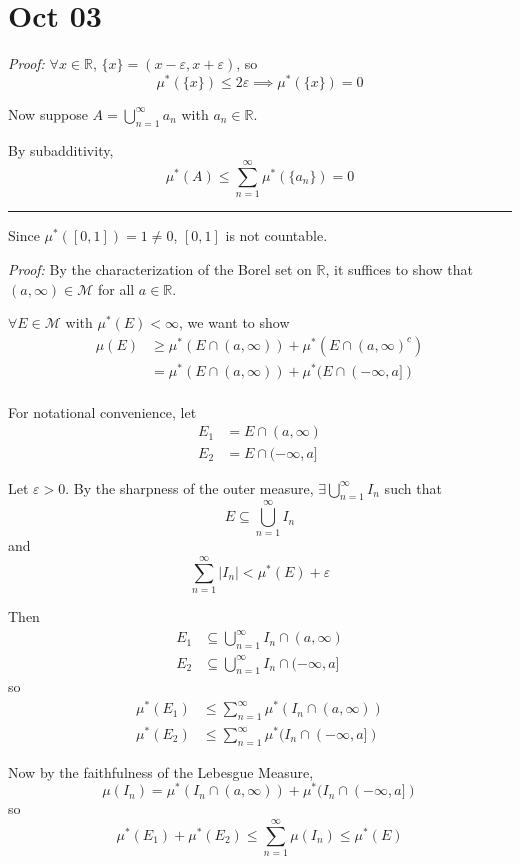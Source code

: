 \documentclass[12pt]{report}
\newcommand{\R}{\mathbb{R}}
\newcommand{\abs}[1]{\left\vert #1 \right\vert}
\newcommand{\ep}{\varepsilon}
\newcommand{\B}{\mathcal{B}}
\newcommand{\M}{\mathcal{M}}
\newcommand{\sub}{\subseteq}
\renewcommand{\div}{\vspace*{10pt}\hrule\vspace*{10pt}}
\newenvironment*{tbox}[2][gray]{
    \begin{tcolorbox}[
        parbox=false,
        colback=#1!5!white,
        colframe=#1!75!black,
        breakable,
        title={#2}
    ]}
    {\end{tcolorbox}}
\begin{document}
\section{Oct 03}
    \begin{tbox}{\textbf{Corollary:} If $A$ is a countable subset of $\R$, $\mu^*(A) = 0$. Furthermore, $[0, 1]$ is not countable. }
        \emph{Proof:} $\forall x \in \R$, $\{x\} = (x - \ep, x + \ep)$, so 
        \[\mu^*(\{x\}) \leq 2\ep \implies \mu^*(\{x\})= 0\]

        Now suppose $A = \bigcup_{n=1}^\infty a_n$ with $a_n \in \R$. 

        By subadditivity, 
        \[\mu^*(A) \leq \sum_{n=1}^{\infty} \mu^*(\{a_n\}) = 0\]
        
        \div 

        Since $\mu^*([0, 1]) = 1 \neq 0$, $[0, 1]$ is not countable.
    \end{tbox}

    \begin{tbox}{\textbf{Proposition:} $\B_{\R} \sub \M$}
        \emph{Proof:} By the characterization of the Borel set on $\R$, it suffices to show that $(a, \infty) \in \M$ for all $a \in \R$. 

        $\forall E \in \M$ with $\mu^*(E) < \infty$, we want to show 
        \begin{align*}
            \mu(E) &\geq \mu^*(E \cap (a, \infty)) + \mu^*(E \cap (a, \infty)^c)\\ 
            &= \mu^*(E \cap (a, \infty)) + \mu^*(E \cap (-\infty, a])\\
        \end{align*}

        For notational convenience, let 
        \begin{align*}
            E_1 &= E \cap (a, \infty)\\ 
            E_2 &= E \cap (-\infty, a]
        \end{align*}

        Let $\ep > 0$. By the sharpness of the outer measure, $\exists \bigcup_{n=1}^\infty I_n$ such that  
        \[E \sub \bigcup_{n=1}^\infty I_n\]
        and 
        \[\sum_{n=1}^{\infty} \abs{I_n} < \mu^*(E) + \ep\]

        Then 
        \begin{align*}
            E_1 &\sub \bigcup_{n=1}^\infty I_n \cap (a, \infty)\\ 
            E_2 &\sub \bigcup_{n=1}^\infty I_n \cap (-\infty, a]
        \end{align*}
        so 
        \begin{align*}
            \mu^*(E_1) &\leq \sum_{n=1}^{\infty} \mu^*(I_n \cap (a, \infty))\\ 
            \mu^*(E_2) &\leq \sum_{n=1}^{\infty} \mu^*(I_n \cap (-\infty, a])
        \end{align*}

        Now by the faithfulness of the Lebesgue Measure,
        \[\mu(I_n) = \mu^*(I_n \cap (a, \infty)) +  \mu^*(I_n \cap (-\infty, a])\]
        so 
        \[\mu^*(E_1) + \mu^*(E_2) \leq \sum_{n=1}^{\infty} \mu(I_n) \leq \mu^*(E)\]
    \end{tbox}
\end{document}
